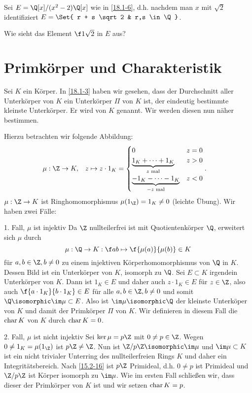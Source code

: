 \begin{ex*}
	Sei $E = \Q[x] / (x^2 - 2)\Q[x]$ wie in \ref{18.1-6}, d.h. nachdem man $x$ mit $\sqrt 2$ identifiziert $E = \Set{ r + s \sqrt 2 & r,s \in \Q }$.

	Wie sieht das Element $\f 1{\sqrt 2}$ in $E$ aus?
\end{ex*}


\section{Primkörper und Charakteristik} \label{sec:18.2}


Sei $K$ ein Körper.
In \ref{18.1-3} haben wir gesehen, dass der Durchschnitt aller Unterkörper von $K$ ein Unterkörper $\Pi$ von $K$ ist, der eindeutig bestimmte kleinste Unterkörper.
Er wird  von $K$ genannt.
Wir werden diesen nun näher bestimmen.

Hierzu betrachten wir folgende Abbildung:
\begin{align*}
	\mu: \Z &\to K, &
	z &\mapsto z \cdot 1_K = \begin{cases}
		0 & z = 0 \\
		\underbrace{1_K + \dotsb + 1_K}_{\text{$z$ mal}} & z > 0 \\
		\underbrace{-1_K - \dotsb - 1_K}_{\text{$-z$ mal}} & z < 0
	\end{cases}.
\end{align*}
$\mu: \Z \to K$ ist Ringhomomorphismus $\mu(1_\Z) = 1_K \neq 0$ (leichte Übung).
Wir haben zwei Fälle:
\begin{seg}{1. Fall, $\mu$ ist injektiv}
	Da $\Z$ nullteilerfrei ist mit Quotientenkörper $\Q$, erweitert sich $\mu$ durch
	\[
		\mu: \Q \to K:
		\f ab \mapsto \f{\mu(a)}{\mu(b)} \in K
	\]
	für $a,b \in \Z, b \neq 0$ zu einem injektiven Körperhomomorphismus von $\Q$ in $K$.
	Dessen Bild ist ein Unterkörper von $K$, isomorph zu $\Q$.
	Sei $E \subset K$ irgendein Unterkörper von $K$.
	Dann ist $1_K \in E$ und daher auch $z \cdot 1_K \in E$ für $z \in \Z$, also auch $\f {a \cdot 1_K}{b \cdot 1_K} \in E$ für alle $a, b \in \Z, b \neq 0$ und somit $\Q \isomorphic \im \mu \subset E$.
	Also ist $\im \mu \isomorphic \Q$ der kleinste Unterköper von $K$ und damit der Primkörper $\Pi$ von $K$.
	Wir definieren in diesem Fall die  $\operatorname{char} K$ von $K$ durch $\operatorname{char} K = 0$.
\end{seg}
\begin{seg}{2. Fall, $\mu$ ist nicht injektiv}
	Sei $\ker \mu = p\Z$ mit $0 \neq p \in \Z$.
	Wegen $0 \neq 1_K = \mu(1_\Z)$ ist $p\Z \neq \Z$.
	Nun ist $\Z / p\Z \isomorphic \im \mu$ und $\im \mu \subset K$ ist ein nicht trivialer Unterring des nullteilerfreien Rings $K$ und daher ein Integritätsbereich.
	Nach \ref{15.2-16} ist $p\Z$ Primideal, d.h. $0 \neq p$ ist Primideal und $\Z / p \Z$ ist Körper isomorph zu $\im \mu$.
	Wie im ersten Fall schließen wir, dass dieser der Primkörper von $K$ ist und wir setzen $\operatorname{char} K = p$.
\end{seg}


